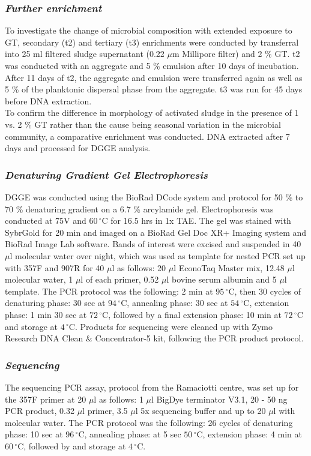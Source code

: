 \documentclass[11pt]{article}
\begin{document}
\subsubsection{\emph{Further enrichment}}
To investigate the change of microbial composition with extended exposure to GT, secondary (t2) and tertiary (t3) enrichments were conducted by transferral into 25 ml filtered sludge supernatant (0.22 $\mu$m Millipore filter) and 2 \% GT. t2 was conducted with an aggregate and 5 \% emulsion after 10 days of incubation. After 11 days of t2, the aggregate and emulsion were transferred again as well as 5 \% of the planktonic dispersal phase from the aggregate. t3 was run for 45 days before DNA extraction.\\

To confirm the difference in morphology of activated sludge in the presence of 1 vs. 2 \% GT rather than the cause being seasonal variation in the microbial community, a comparative enrichment was conducted. DNA extracted after 7 days and processed for DGGE analysis.
 
\subsubsection{\emph{Denaturing Gradient Gel Electrophoresis}}
DGGE was conducted using the BioRad DCode system and protocol for 50 \% to 70 \% denaturing gradient on a 6.7 \% arcylamide gel. Electrophoresis was conducted at 75V and $60\,^{\circ}\mathrm{C}$ for 16.5 hrs in 1x TAE. The gel was stained with SybrGold for 20 min and imaged on a BioRad Gel Doc XR+ Imaging system and BioRad Image Lab software. Bands of interest were excised and suspended in 40 $\mu$l molecular water over night, which was used as template for nested PCR set up with 357F and 907R for 40 $\mu$l as follows: 20 $\mu$l EconoTaq Master mix, 12.48 $\mu$l molecular water, 1 $\mu$l of each primer, 0.52 $\mu$l bovine serum albumin and 5 $\mu$l template. The PCR protocol was the following: 2 min at $95\,^{\circ}\mathrm{C}$, then 30 cycles of denaturing phase: 30 sec at $94\,^{\circ}\mathrm{C}$, annealing phase: 30 sec at  $54\,^{\circ}\mathrm{C}$, extension phase: 1 min 30 sec at $72\,^{\circ}\mathrm{C}$, followed by a final extension phase: 10 min at $72\,^{\circ}\mathrm{C}$ and storage at $4\,^{\circ}\mathrm{C}$. Products for sequencing were cleaned up with Zymo Research DNA Clean \& Concentrator-5 kit, following the PCR product protocol.

\subsubsection{\emph{Sequencing}}
The sequencing PCR assay, protocol from the Ramaciotti centre, was set up for the 357F primer at 20 $\mu$l as follows: 1 $\mu$l BigDye terminator V3.1, 20 - 50 ng PCR product, 0.32 $\mu$l primer, 3.5 $\mu$l 5x sequencing buffer and up to 20 $\mu$l with molecular water. The PCR protocol was the following: 26 cycles of denaturing phase: 10 sec at $96\,^{\circ}\mathrm{C}$, annealing phase:  at 5 sec $50\,^{\circ}\mathrm{C}$, extension phase: 4 min at $60\,^{\circ}\mathrm{C}$, followed by and storage at $4\,^{\circ}\mathrm{C}$.\\
\end{document}
